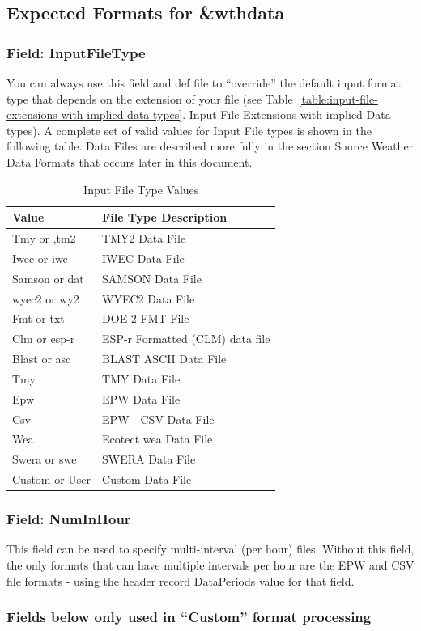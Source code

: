 \subsection{Expected Formats for \&wthdata}\label{expected-formats-for-wthdata}

\subsubsection{Field: InputFileType}\label{field-inputfiletype}

You can always use this field and def file to ``override'' the default input format type that depends on the extension of your file (see Table~\ref{table:input-file-extensions-with-implied-data-types}. Input File Extensions with implied Data types). A complete set of valid values for Input File types is shown in the following table. Data Files are described more fully in the section Source Weather Data Formats that occurs later in this document.

\begin{longtable}[c]{@{}ll@{}}
\caption{Input File Type Values \protect \label{table:input-file-type-values}}\\
\toprule 
Value & File Type Description \tabularnewline \midrule
\endhead
Tmy or ,tm2 & TMY2 Data File \tabularnewline
Iwec or iwc & IWEC Data File \tabularnewline
Samson or dat & SAMSON Data File \tabularnewline
wyec2 or wy2 & WYEC2 Data File \tabularnewline
Fmt or txt & DOE-2 FMT File \tabularnewline
Clm or esp-r & ESP-r Formatted (CLM) data file \tabularnewline
Blast or asc & BLAST ASCII Data File \tabularnewline
Tmy & TMY Data File \tabularnewline
Epw & EPW Data File \tabularnewline
Csv & EPW - CSV Data File \tabularnewline
Wea & Ecotect wea Data File \tabularnewline
Swera or swe & SWERA Data File \tabularnewline
Custom or User & Custom Data File \tabularnewline
\bottomrule
\end{longtable}

\subsubsection{Field: NumInHour}\label{field-numinhour}

This field can be used to specify multi-interval (per hour) files. Without this field, the only formats that can have multiple intervals per hour are the EPW and CSV file formats - using the header record DataPeriods value for that field.

\subsubsection{\texorpdfstring{Fields below only used in ``Custom'' format processing}{Fields below only used in Custom format processing}}\label{fields-below-only-used-in-custom-format-processing}

